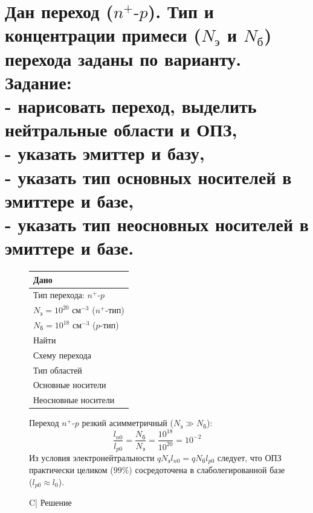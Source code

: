\documentclass[12pt,a4paper]{article}
\theoremstyle{plain}
\theoremstyle{definition}
\theoremstyle{remark}
\numberwithin{equation}{section}
\begin{document}
\pagebreak

\section{\large\textnormal{Дан переход ($n^+\text{-}p$). Тип и концентрации примеси ($N_\text{э}$ и $N_\text{б}$) перехода заданы по варианту. \\
Задание: \\
- нарисовать переход, выделить нейтральные области и ОПЗ, \\
- указать эмиттер и базу, \\
- указать тип основных носителей в эмиттере и базе, \\
- указать тип неосновных носителей в эмиттере и базе.}}

\begin{figure}[H]
    \centering
    \begin{minipage}[t]{0.3\textwidth}
    \vspace{0em}
    \begin{tabularx}{\textwidth}{|X|}
        \hline
        \multicolumn{1}{|C|}{Дано} \\
        \hline
        Тип перехода: $n^+\text{-}p$ \\
        $N_\text{э} = 10^{20}$ см$^{-3}$ ($n^+$-тип) \\
        $N_\text{б} = 10^{18}$ см$^{-3}$ ($p$-тип) \\
        \hline
        \multicolumn{1}{|C|}{Найти} \\
        \hline
        Схему перехода \\
        Тип областей \\
        Основные носители \\
        Неосновные носители \\
        \hline
    \end{tabularx}

    \vspace{0.8em}
    Переход $n^+\text{-}p$ резкий асимметричный ($N_\text{э} \gg N_\text{б}$):
    \begin{equation*}
        \frac{l_{n0}}{l_{p0}} = \frac{N_\text{б}}{N_\text{э}} = \frac{10^{18}}{10^{20}} = 10^{-2}
    \end{equation*}
    Из условия электронейтральности $q N_\text{э} l_{n0} = q N_\text{б} l_{p0}$ следует, что ОПЗ практически целиком ($99\%$) сосредоточена в слаболегированной базе ($l_{p0} \approx l_0$).
    \end{minipage}\hfill\begin{minipage}[t]{0.7\textwidth}
        \vspace{0em}
        \begin{tabularx}{\textwidth}{C|}
            \hline
            Решение \\
            \hline
        \end{tabularx}


\end{minipage}
\end{figure}
\end{document}
